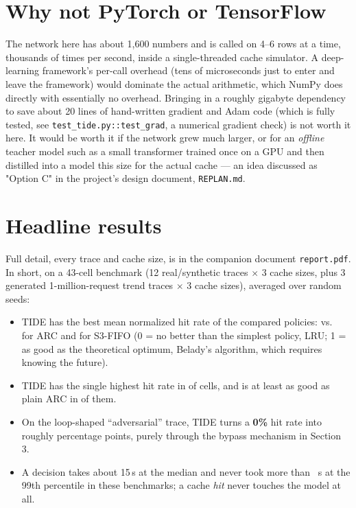 \documentclass[10pt,a4paper]{article}
\newcommand{\code}[1]{\texttt{#1}}
\begin{document}
\section{Why not PyTorch or TensorFlow}
The network here has about 1{,}600 numbers and is called on 4--6 rows at a time, thousands of times per
second, inside a single-threaded cache simulator. A deep-learning framework's per-call overhead (tens of
microseconds just to enter and leave the framework) would dominate the actual arithmetic, which NumPy
does directly with essentially no overhead. Bringing in a roughly gigabyte dependency to save about 20
lines of hand-written gradient and Adam code (which is fully tested, see
\code{test\_tide.py::test\_grad}, a numerical gradient check) is not worth it here. It would be
worth it if the network grew much larger, or for an \emph{offline} teacher model such as a small
transformer trained once on a GPU and then distilled into a model this size for the actual cache --- an
idea discussed as "Option C" in the project's design document, \code{REPLAN.md}.

\section{Headline results}
Full detail, every trace and cache size, is in the companion document \code{report.pdf}. In short, on a
43-cell benchmark (12 real/synthetic traces $\times$ 3 cache sizes, plus 3 generated 1-million-request
trend traces $\times$ 3 cache sizes), averaged over \Seeds{} random seeds:
\begin{itemize}
  \item TIDE has the best mean normalized hit rate of the compared policies: \NormTIDE{} vs.\ \NormARC{}
        for ARC and \NormSthree{} for S3-FIFO (0 = no better than the simplest policy, LRU; 1 = as good as
        the theoretical optimum, Belady's algorithm, which requires knowing the future).
  \item TIDE has the single highest hit rate in \WinsTIDE{} of \NCells{} cells, and is at least as good as
        plain ARC in \GeARC{} of them.
  \item On the loop-shaped ``adversarial'' trace, TIDE turns a \textbf{0\%} hit rate into roughly
        \textbf{\AdvGain} percentage points, purely through the bypass mechanism in Section 3.
  \item A decision takes about 15\,\textmu s at the median and never took more than \PNineNineMax\,\textmu
        s at the 99th percentile in these benchmarks; a cache \emph{hit} never touches the model at all.
\end{itemize}
\end{document}
